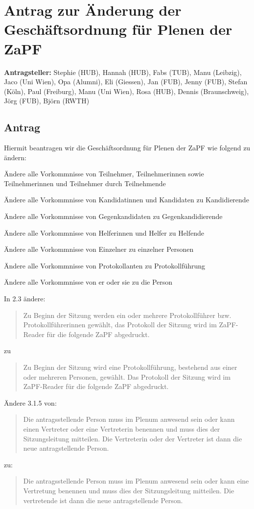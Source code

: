 \documentclass[draft,10pt,oneside]{scrartcl}
\begin{document}
\section*{Antrag zur Änderung der Geschäftsordnung für Plenen der ZaPF}

\textbf{Antragsteller:} Stephie (HUB), Hannah (HUB), Fabs (TUB), Manu (Leibzig), Jaco (Uni Wien), Opa (Alumni), Eli (Giessen), Jan (FUB), Jenny (FUB), Stefan (Köln), Paul (Freiburg), Manu (Uni Wien), Rosa (HUB), Dennis (Braunschweig), 
Jörg (FUB), Björn (RWTH)

\subsection*{Antrag}

Hiermit beantragen wir die Geschäftsordnung für Plenen der ZaPF wie folgend zu
ändern:

Ändere alle Vorkommnisse von \glqq{}Teilnehmer\grqq{}, \glqq{}Teilnehmerinnen\grqq{} sowie \glqq{}Teilnehmerinnen und Teilnehmer\grqq{} durch \glqq{}Teilnehmende\grqq{}

Ändere alle Vorkommnisse von \glqq{}Kandidatinnen und Kandidaten\grqq{} zu \glqq{}Kandidierende\grqq{}

Ändere alle Vorkommnisse von \glqq{}Gegenkandidaten\grqq{} zu \glqq{}Gegenkandidierende\grqq{}

Ändere alle Vorkommnisse von \glqq{}Helferinnen und Helfer\grqq{} zu \glqq{}Helfende\grqq{}

Ändere alle Vorkommnisse von \glqq{}Einzelner\grqq{} zu \glqq{}einzelner Personen\grqq{}

Ändere alle Vorkommnisse von \glqq{}Protokollanten\grqq{} zu \glqq{}Protokollführung\grqq{}

Ändere alle Vorkommnisse von \glqq{}er oder sie\grqq{} zu \glqq{}die Person\grqq{}

In 2.3 ändere:
\begin{quote}
    Zu Beginn der Sitzung werden ein oder mehrere Protokollführer bzw.
    Protokollführerinnen gewählt, das Protokoll der Sitzung wird im
    ZaPF-Reader für die folgende ZaPF abgedruckt.
\end{quote}
zu
\begin{quote}
    Zu Beginn der Sitzung wird eine Protokollführung, bestehend aus einer
    oder mehreren Personen, gewählt.
    Das Protokoll der Sitzung wird im ZaPF-Reader für die folgende ZaPF
    abgedruckt.
\end{quote}

Ändere 3.1.5 von:
\begin{quote}
    Die antragsstellende Person muss im Plenum anwesend sein
    oder kann einen Vertreter oder eine Vertreterin benennen und muss dies
    der Sitzungsleitung mitteilen.
    Die Vertreterin oder der Vertreter ist dann die neue antragstellende Person.
\end{quote}
zu:
\begin{quote}
    Die antragsstellende Person muss im Plenum anwesend sein
    oder kann eine Vertretung benennen und muss dies
    der Sitzungsleitung mitteilen.
    Die vertretende ist dann die neue antragstellende Person.
\end{quote}
\end{document}
